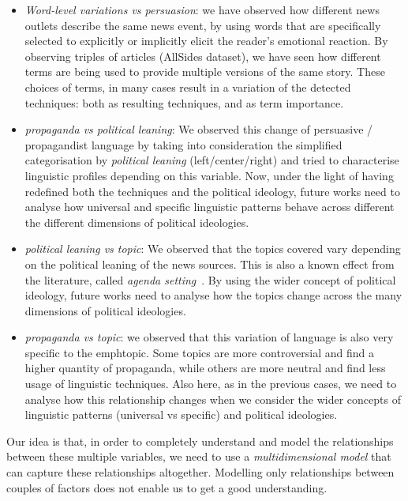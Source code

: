 \begin{itemize}
    \item \emph{Word-level variations vs persuasion}: we have observed how different news outlets describe the same news event, by using words that are specifically selected to explicitly or implicitly elicit the reader’s emotional reaction. By observing triples of articles (AllSides dataset), we have seen how different terms are being used to provide multiple versions of the same story. These choices of terms, in many cases result in a variation of the detected techniques: both as resulting techniques, and as term importance.

    \item \emph{propaganda vs political leaning}: We observed this change of persuasive / propagandist language by taking into consideration the simplified categorisation by \emph{political leaning} (left/center/right) and tried to characterise linguistic profiles depending on this variable. Now, under the light of having redefined both the techniques and the political ideology, future works need to analyse how universal and specific linguistic patterns behave across different the different dimensions of political ideologies.

    \item \emph{political leaning vs topic}: We observed that the topics covered vary depending on the political leaning of the news sources. This is also a known effect from the literature, called \emph{agenda setting}~\citep{mccombs1972agenda}. By using the wider concept of political ideology, future works need to analyse how the topics change across the many dimensions of political ideologies.

    \item \emph{propaganda vs topic}: we observed that this variation of language is also very specific to the emph{topic}. Some topics are more controversial and find a higher quantity of propaganda, while others are more neutral and find less usage of linguistic techniques. Also here, as in the previous cases, we need to analyse how this relationship changes when we consider the wider concepts of linguistic patterns (universal vs specific) and political ideologies.
\end{itemize}

Our idea is that, in order to completely understand and model the relationships between these multiple variables, we need to use a \emph{multidimensional model} that can capture these relationships altogether. Modelling only relationships between couples of factors does not enable us to get a good understanding.

